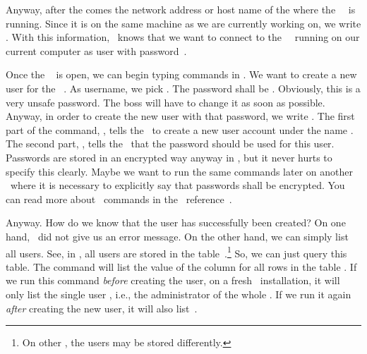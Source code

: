 Anyway, after the  comes the network address or host name of the where the \postgresql\ \server\ is running.
Since it is on the same machine as we are currently working on, we write \localhost.
With this information, \psql\ knows that we want to connect to the \postgresql\ \server\ running on our current computer as user  with password~.%
%
\begin{sloppypar}%
Once the \psql\  is open, we can begin typing commands in \sql.
We want to create a new user for the \psql\ \server.
As username, we pick .
The password shall be .
Obviously, this is a very unsafe password.
The boss will have to change it as soon as possible.
Anyway, in order to create the new user with that password, we write .
The first part of the command, , tells the \server\ to create a new user account under the name .
The second part, , tells the \server\ that the password  should be used for this user.
Passwords are stored in an encrypted way anyway in \postgresql, but it never hurts to specify this clearly.
Maybe we want to run the same commands later on another \dbms\ where it is necessary to explicitly say that passwords shall be encrypted.
You can read more about \sql\ commands in the \postgresql\ reference~\cite{PGDG:PD:SC}.%
\end{sloppypar}%
%
%
%
Anyway.
How do we know that the user  has successfully been created?
On one hand, \psql\ did not give us an error message.
On the other hand, we can simply list all users.
See, in \postgresql, all users are stored in the table~.\footnote{%
On other , the users may be stored differently.}
So, we can just query this table.
The \sql{} command  will list the value of the column  for all rows in the table .
If we run this command \emph{before} creating the user, on a fresh \postgresql\ installation, it will only list the single user , i.e., the administrator of the whole \dbms.
If we run it again \emph{after} creating the new user, it will also list~.

